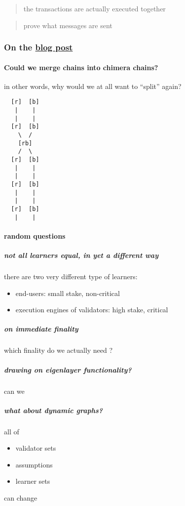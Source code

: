 \documentclass{article}
\theoremstyle{definition}
\begin{document}
\begin{quote}
  the transactions are actually executed together
\end{quote}

\begin{quote}
  prove what messages are sent
\end{quote}
\subsubsection{On the %
  \href{https://anoma.net/blog/heterogeneous-paxos-and-multi-chain-atomic-commits/}{%
    blog post%
  }
}
\label{sec:blog-post-discussion}

\paragraph{Could we merge chains into chimera chains?}

in other words,
why would we at all want to “split” again?

\begin{verbatim}
  [r]  [b]
   |    |
   |    |
  [r]  [b]
    \  / 
    [rb]
    /  \ 
  [r]  [b]
   |    |
   |    |
  [r]  [b]
   |    |
   |    |
  [r]  [b]
   |    |
\end{verbatim}

\paragraph{random questions}

\subparagraph{not all learners equal, in yet a different way}

there are two very different type of learners:
\begin{itemize}
\item end-users: small stake, non-critical
\item execution engines of validators: high stake, critical
\end{itemize}




\subparagraph{on immediate finality}
which finality do we actually need ?

\subparagraph{drawing on eigenlayer functionality?}
can we

\subparagraph{what about dynamic graphs?}
all of
\begin{itemize}
\item validator sets  
\item assumptions 
\item learner sets
\end{itemize}
can change
\end{document}
